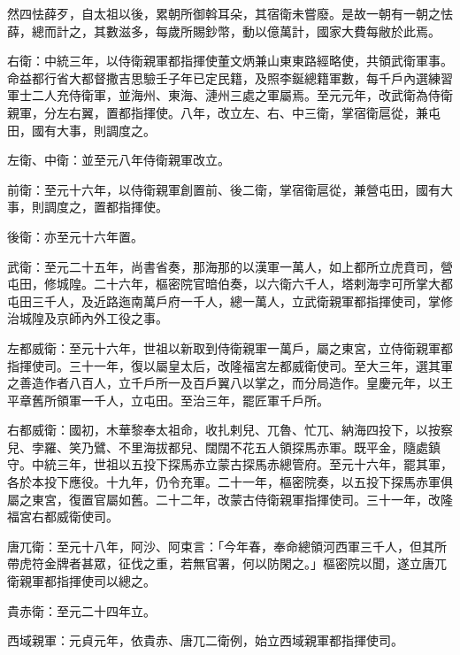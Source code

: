 \begin{pinyinscope}
 然四怯薛歹，自太祖以後，累朝所御斡耳朵，其宿衛未嘗廢。是故一朝有一朝之怯薛，總而計之，其數滋多，每歲所賜鈔幣，動以億萬計，國家大費每敝於此焉。



 右衛：中統三年，以侍衛親軍都指揮使董文炳兼山東東路經略使，共領武衛軍事。命益都行省大都督撒吉思驗壬子年已定民籍，及照李鋋總籍軍數，每千戶內選練習軍士二人充侍衛軍，並海州、東海、漣州三處之軍屬焉。至元元年，改武衛為侍衛親軍，分左右翼，置都指揮使。八年，改立左、右、中三衛，掌宿衛扈從，兼屯田，國有大事，則調度之。



 左衛、中衛：並至元八年侍衛親軍改立。



 前衛：至元十六年，以侍衛親軍創置前、後二衛，掌宿衛扈從，兼營屯田，國有大事，則調度之，置都指揮使。



 後衛：亦至元十六年置。



 武衛：至元二十五年，尚書省奏，那海那的以漢軍一萬人，如上都所立虎賁司，營屯田，修城隍。二十六年，樞密院官暗伯奏，以六衛六千人，塔剌海孛可所掌大都屯田三千人，及近路迤南萬戶府一千人，總一萬人，立武衛親軍都指揮使司，掌修治城隍及京師內外工役之事。



 左都威衛：至元十六年，世祖以新取到侍衛親軍一萬戶，屬之東宮，立侍衛親軍都指揮使司。三十一年，復以屬皇太后，改隆福宮左都威衛使司。至大三年，選其軍之善造作者八百人，立千戶所一及百戶翼八以掌之，而分局造作。皇慶元年，以王平章舊所領軍一千人，立屯田。至治三年，罷匠軍千戶所。



 右都威衛：國初，木華黎奉太祖命，收扎剌兒、兀魯、忙兀、納海四投下，以按察兒、孛羅、笑乃鷿、不里海拔都兒、闊闊不花五人領探馬赤軍。既平金，隨處鎮守。中統三年，世祖以五投下探馬赤立蒙古探馬赤總管府。至元十六年，罷其軍，各於本投下應役。十九年，仍令充軍。二十一年，樞密院奏，以五投下探馬赤軍俱屬之東宮，復置官屬如舊。二十二年，改蒙古侍衛親軍指揮使司。三十一年，改隆福宮右都威衛使司。



 唐兀衛：至元十八年，阿沙、阿束言：「今年春，奉命總領河西軍三千人，但其所帶虎符金牌者甚眾，征伐之重，若無官署，何以防閑之。」樞密院以聞，遂立唐兀衛親軍都指揮使司以總之。



 貴赤衛：至元二十四年立。



 西域親軍：元貞元年，依貴赤、唐兀二衛例，始立西域親軍都指揮使司。




\end{pinyinscope}
